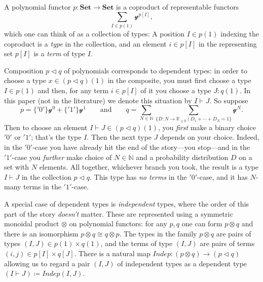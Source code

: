 \documentclass[11pt, one side, article]{memoir}
\theoremstyle{definition}
\theoremstyle{plain}
\newcommand{\Cat}[1]{\mathbf{#1}}%
\newcommand{\Fun}[1]{\mathit{#1}}%
\newcommand{\nn}{\mathbb{N}}
\newcommand{\rr}{\mathbb{R}}
\newcommand{\smset}{\Cat{Set}}
\newcommand{\yon}{\mathcal{y}}
\newcommand{\0}{\textsf{0}}
\newcommand{\1}{\tn{\textsf{1}}}
\newcommand{\tri}{\mathbin{\triangleleft}}
\newcommand{\indep}{\Fun{Indep}}
\newcommand{\qqand}{\qquad\text{and}\qquad}
\begin{document}
A polynomial functor $p\colon\smset\to\smset$ is a coproduct of representable functors
\[\sum_{I\in p(1)}\yon^{p[I]},\]
which one can think of as a collection of types: A position $I\in p(1)$ indexing the coproduct is a \emph{type} in the collection, and an element $i\in p[I]$ in the representing set $p[I]$ is a \emph{term} of type $I$. 

Composition $p\tri q$ of polynomials corresponds to dependent types: in order to choose a type $x\in (p\tri q)(1)$ in the composite, you must first choose a type $I\in p(1)$ and then, for any term $i\in p[I]$ of it you choose a type $J:q(1)$. In this paper (not in the literature) we denote this situation by $I\vdash J$. So suppose
\[
  p=\{{'0'}\}\yon^0+\{{'1'}\}\yon^1
  \qqand 
  q=\sum_{N\in\nn}\sum_{\{D\colon N\to\rr_{\geq 0}\mid D_1+\cdots+D_N=1\}}\yon^N.
\]
Then to choose an element $I\vdash J\in (p\tri q)(1)$, you \emph{first} make a binary choice ${'0'}$ or ${'1'}$; that's the type $I$. Then the next type $J$ depends on your choice. Indeed, in the ${'0'}$-case you have already hit the end of the story---you stop---and in the ${'1'}$-case you \emph{further} make choice of $N\in\nn$ and a probability distribution $D$ on a set with $N$ elements. All together, whichever branch you took, the result is a type $I\vdash J$ in the collection $p\tri q$. This type has \emph{no terms} in the ${'0'}$-case, and it has $N$-many terms in the ${'1'}$-case.

A special case of dependent types is \emph{independent} types, where the order of this part of the story \emph{doesn't} matter. These are represented using a symmetric monoidal product $\otimes$ on polynomial functors: for any $p,q$ one can form $p\otimes q$ and there is an isomorphism $p\otimes q\cong q\otimes p$. The types in the family $p\otimes q$ are pairs of types $(I,J)\in p(1)\times q(1)$, and the terms of type $(I,J)$ are pairs of terms $(i,j)\in p[I]\times q[J]$. There is a natural map $\indep\colon(p\otimes q)\to (p\tri q)$ allowing us to regard a pair $(I,J)$ of independent types as a dependent type $(I\vdash J)\coloneqq\indep(I,J)$.
\end{document}

